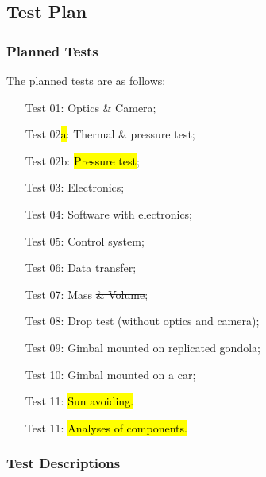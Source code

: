 
\pagebreak
\subsection{Test Plan}

\subsubsection{Planned Tests}
The planned tests are as follows:

\begin{enumerate}[leftmargin=2.1cm]
   \item[Test 01:] Optics \& Camera;
   \item[Test 02\hl{a}:] Thermal \st{\& pressure test};
   \item[Test 02b:] \hl{Pressure test};
   \item[Test 03:] Electronics;
   \item[Test 04:] Software with electronics;
   \item[Test 05:] Control system;
   \item[Test 06:] Data transfer;
   \item[Test 07:] Mass \st{\& Volume};
   \item[Test 08:] Drop test (without optics and camera);
   \item[Test 09:] Gimbal mounted on replicated gondola;
   \item[Test 10:] Gimbal mounted on a car;
   \item[Test 11:] \hl{Sun avoiding.}
   \item[Test 11:] \hl{Analyses of components.}
\end{enumerate}

\subsubsection{Test Descriptions}












